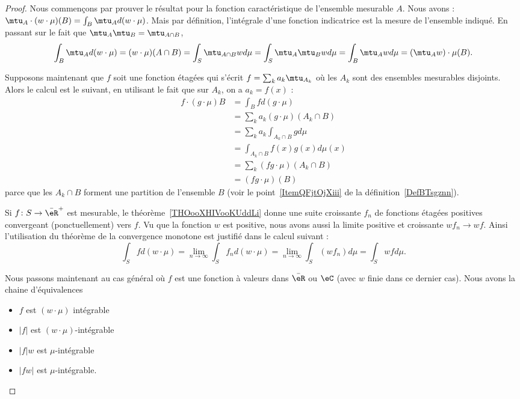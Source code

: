 \begin{proof}
	Nous commençons par prouver le résultat pour la fonction caractéristique de l'ensemble mesurable \( A\). Nous avons : \( \mtu_A\cdot(w\cdot \mu)(B)=\int_B\mtu_Ad(w\cdot \mu)\). Mais par définition, l'intégrale d'une fonction indicatrice est la mesure de l'ensemble indiqué. En passant sur le fait que \( \mtu_A\mtu_B=\mtu_{A\cap B}\),
	\begin{equation}
		\int_B\mtu_Ad(w\cdot \mu)=   (w\cdot\mu)(A\cap B)=\int_S\mtu_{A\cap B}wd\mu=\int_S\mtu_A\mtu_Bwd\mu=\int_B\mtu_Awd\mu=(\mtu_Aw)\cdot\mu(B).
	\end{equation}

	Supposons maintenant que \( f\) soit une fonction étagées qui s'écrit \( f=\sum_ka_k\mtu_{A_k}\) où les \( A_k\) sont des ensembles mesurables disjoints. Alors le calcul est le suivant, en utilisant le fait que sur \( A_k\), on a \( a_k=f(x)\) :
	\begin{subequations}
		\begin{align}
			f\cdot(g\cdot \mu)B & =\int_Bfd(g\cdot \mu)            \\
			                    & =\sum_ka_k(g\cdot\mu)(A_k\cap B) \\
			                    & =\sum_ka_k\int_{A_k\cap B}gd\mu  \\
			                    & =\int_{A_k\cap B}f(x)g(x)d\mu(x) \\
			                    & =\sum_k(fg\cdot\mu)(A_k\cap B)   \\
			                    & =(fg\cdot\mu)(B)
		\end{align}
	\end{subequations}
	parce que les \( A_k\cap B\) forment une partition de l'ensemble \( B\) (voir le point~\ref{ItemQFjtOjXiii} de la définition~\ref{DefBTsgznn}).

	Si \( f\colon S\to \bar\eR^+\) est mesurable, le théorème~\ref{THOooXHIVooKUddLi} donne une suite croissante \( f_n\) de fonctions étagées positives convergeant (ponctuellement) vers \( f\). Vu que la fonction \( w\) est positive, nous avons aussi la limite positive et croissante \( wf_n\to wf\). Ainsi l'utilisation du théorème de la convergence monotone est justifié dans le calcul suivant :
	\begin{equation}
		\int_Sfd(w\cdot \mu)=\lim_{n\to \infty} \int_Sf_nd(w\cdot\mu)=\lim_{n\to \infty} \int_S(wf_n)d\mu=\int_Swfd\mu.
	\end{equation}

	Nous passons maintenant au cas général où \( f\) est une fonction à valeurs dans \( \bar\eR\) ou \( \eC\) (avec \( w\) finie dans ce dernier cas). Nous avons la chaine d'équivalences
	\begin{itemize}
		\renewcommand{\labelitemi}{\( \Leftrightarrow\)}
		\item \( f\) est \( (w\cdot\mu)\) intégrable
		\item \( | f |\) est \( (w\cdot\mu)\)-intégrable
		\item \( | f |w\) est \( \mu\)-intégrable
		\item \( | fw |\) est \( \mu\)-intégrable.
	\end{itemize}


\end{proof}

